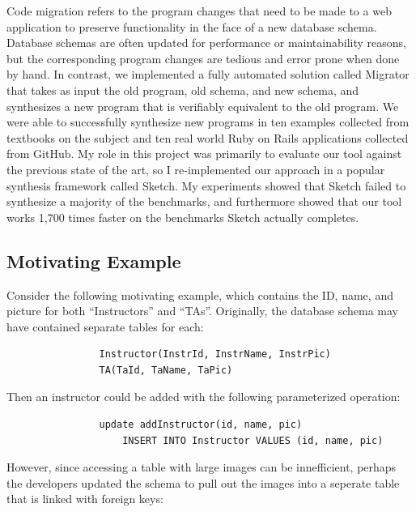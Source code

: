 \documentclass[]{article}
\begin{document}
            Code migration refers to the program changes that need to be made to a web application to preserve functionality in the face of a new database schema. Database schemas are often updated for performance or maintainability reasons, but the corresponding program changes are tedious and error prone when done by hand. In contrast, we implemented a fully automated solution called Migrator that takes as input the old program, old schema, and new schema, and synthesizes a new program that is verifiably equivalent to the old program. We were able to successfully synthesize new programs in ten examples collected from textbooks on the subject and ten real world Ruby on Rails applications collected from GitHub. My role in this project was primarily to evaluate our tool against the previous state of the art, so I re-implemented our approach in a popular synthesis framework called Sketch. My experiments showed that Sketch failed to synthesize a majority of the benchmarks, and furthermore showed that our tool works 1,700 times faster on the benchmarks Sketch actually completes.

        \subsection{Motivating Example}

            Consider the following motivating example, which contains the ID, name, and picture for both ``Instructors'' and ``TAs''. Originally, the database schema may have contained separate tables for each:
             
            \begin{verbatim}
                Instructor(InstrId, InstrName, InstrPic)
                TA(TaId, TaName, TaPic)     
            \end{verbatim}
            
            Then an instructor could be added with the following parameterized operation:

            \begin{verbatim}
                update addInstructor(id, name, pic) 
                    INSERT INTO Instructor VALUES (id, name, pic)
            \end{verbatim}

            However, since accessing a table with large images can be innefficient, perhaps the developers updated the schema to pull out the images into a seperate table that is linked with foreign keys:
            
\end{document}
